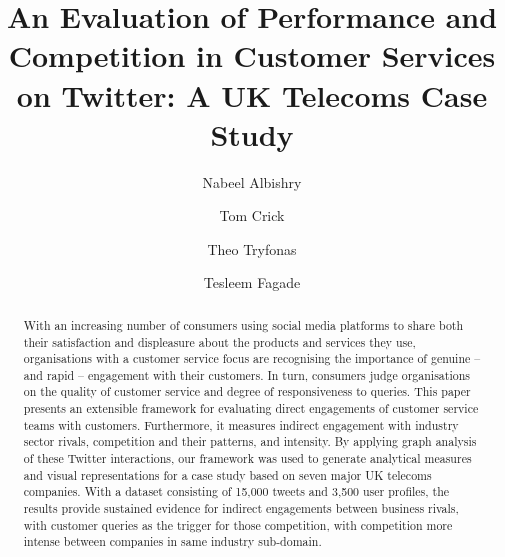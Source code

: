 \documentclass[sigconf]{acmart}
\begin{document}
\title[An Evaluation of Performance and Competition in Customer Services on
  Twitter]{An Evaluation of Performance and Competition in Customer Services on
  Twitter: A UK Telecoms Case Study}

\author{Nabeel Albishry}

\author{Tom Crick}

\author{Theo Tryfonas}


\author{Tesleem Fagade}



 
\renewcommand{\shortauthors}{Albishry, Crick, Tryfonas, and Fagade}


\begin{abstract}
With an increasing number of consumers using social media platforms to
share both their satisfaction and displeasure about the products and
services they use, organisations with a customer service focus are
recognising the importance of genuine -- and rapid -- engagement with
their customers. In turn, consumers judge organisations on the quality
of customer service and degree of responsiveness to queries. This
paper presents an extensible framework for evaluating direct
engagements of customer service teams with customers. Furthermore, it
measures indirect engagement with industry sector rivals, competition
and their patterns, and intensity. By applying graph analysis of these
Twitter interactions, our framework was used to generate analytical
measures and visual representations for a case study based on seven
major UK telecoms companies. With a dataset consisting of 15,000
tweets and 3,500 user profiles, the results provide sustained evidence
for indirect engagements between business rivals, with customer
queries as the trigger for those competition, with competition more
intense between companies in same industry sub-domain.
\end{abstract}
\end{document}
